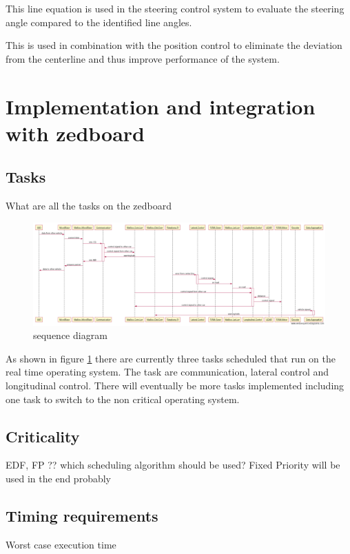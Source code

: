 This line equation is used in the steering control system to evaluate the steering angle compared to the identified line angles.

This is used in combination with the position control to eliminate the deviation from the centerline and thus improve performance of the system.

\section{Implementation and integration with zedboard}
\subsection{Tasks}
What are all the tasks on the zedboard

\begin{figure}[H]
  \includegraphics[width=\textwidth]{./img/sekvensdiagram.png}
  \centering
  \caption{sequence diagram}
  \label{fig:sequence diagram}
\end{figure}
 As shown in figure \ref{fig:sequence diagram} there are currently three tasks scheduled that run on the real time operating system. The task are communication, lateral control and longitudinal control. There will eventually be more tasks implemented including one task to switch to the non critical operating system.

\subsection{Criticality}
EDF, FP ?? which scheduling algorithm should be used? Fixed Priority will be used in the end probably
\subsection{Timing requirements}
Worst case execution time